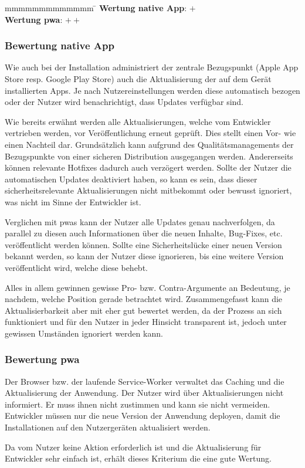 \begin{tabbing}
	mmmmmmmmmmmmm				\= \kill
	\textbf{Wertung native App}: \> $+$ \\ 
	\textbf{Wertung \ac{pwa}}: \> $++$ 
\end{tabbing}

\subsubsection{Bewertung native App}
Wie auch bei der Installation administriert der zentrale Bezugspunkt (Apple App Store resp. Google Play Store) auch die Aktualisierung der auf dem Gerät installierten Apps. Je nach Nutzereinstellungen werden diese automatisch bezogen oder der Nutzer wird benachrichtigt, dass Updates verfügbar sind.

Wie bereits erwähnt werden alle Aktualisierungen, welche vom Entwickler vertrieben werden, vor Veröffentlichung erneut geprüft. Dies stellt einen Vor- wie einen Nachteil dar. Grundsätzlich kann aufgrund des Qualitätsmanagements der Bezugspunkte von einer sicheren Distribution ausgegangen werden. Andererseits können relevante Hotfixes dadurch auch verzögert werden. Sollte der Nutzer die automatischen Updates deaktiviert haben, so kann es sein, dass dieser sicherheitsrelevante Aktualisierungen nicht mitbekommt oder bewusst ignoriert, was nicht im Sinne der Entwickler ist.

Verglichen mit \acp{pwa} kann der Nutzer alle Updates genau nachverfolgen, da parallel zu diesen auch Informationen über die neuen Inhalte, Bug-Fixes, etc. veröffentlicht werden können. Sollte eine Sicherheitslücke einer neuen Version bekannt werden, so kann der Nutzer diese ignorieren, bis eine weitere Version veröffentlicht wird, welche diese behebt.

Alles in allem gewinnen gewisse Pro- bzw. Contra-Argumente an Bedeutung, je nachdem, welche Position gerade betrachtet wird. Zusammengefasst kann die Aktualisierbarkeit aber mit eher gut bewertet werden, da der Prozess an sich funktioniert und für den Nutzer in jeder Hinsicht transparent ist, jedoch unter gewissen Umständen ignoriert werden kann.

\subsubsection{Bewertung \ac{pwa}}
Der Browser bzw. der laufende Service-Worker verwaltet das Caching und die Aktualisierung der Anwendung. Der Nutzer wird über Aktualisierungen nicht informiert. Er muss ihnen nicht zustimmen und kann sie nicht vermeiden. Entwickler müssen nur die neue Version der Anwendung deployen, damit die Installationen auf den Nutzergeräten aktualisiert werden.

Da vom Nutzer keine Aktion erforderlich ist und die Aktualisierung für Entwickler sehr einfach ist, erhält dieses Kriterium die eine gute Wertung.
